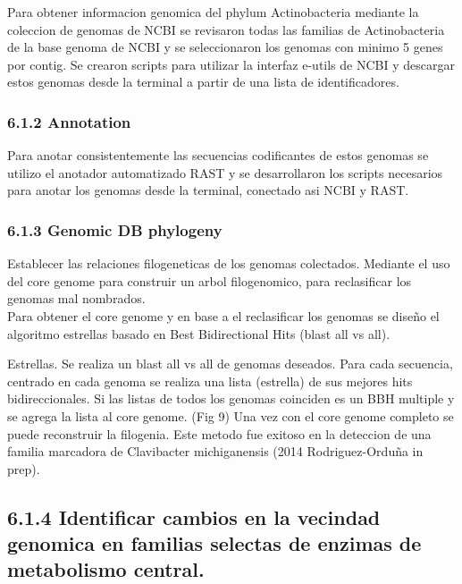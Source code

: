 \documentclass[12pt,twoside]{reedthesis}
\begin{document}
  Para obtener informacion genomica del phylum Actinobacteria mediante la
  coleccion de genomas de NCBI se revisaron todas las familias de
  Actinobacteria de la base genoma de NCBI y se seleccionaron los genomas
  con minimo 5 genes por contig. Se crearon scripts para utilizar la
  interfaz e-utils de NCBI y descargar estos genomas desde la terminal a
  partir de una lista de identificadores.
  
  \subsubsection{6.1.2 Annotation}\label{annotation}
  
  Para anotar consistentemente las secuencias codificantes de estos
  genomas se utilizo el anotador automatizado RAST y se desarrollaron los
  scripts necesarios para anotar los genomas desde la terminal, conectado
  asi NCBI y RAST.
  
  \subsubsection{6.1.3 Genomic DB phylogeny}\label{genomic-db-phylogeny}
  
  Establecer las relaciones filogeneticas de los genomas colectados.
  Mediante el uso del core genome para construir un arbol filogenomico,
  para reclasificar los genomas mal nombrados.\\
  Para obtener el core genome y en base a el reclasificar los genomas se
  diseño el algoritmo estrellas basado en Best Bidirectional Hits (blast
  all vs all).
  
  Estrellas. Se realiza un blast all vs all de genomas deseados. Para cada
  secuencia, centrado en cada genoma se realiza una lista (estrella) de
  sus mejores hits bidireccionales. Si las listas de todos los genomas
  coinciden es un BBH multiple y se agrega la lista al core genome. (Fig
  9) Una vez con el core genome completo se puede reconstruir la
  filogenia. Este metodo fue exitoso en la deteccion de una familia
  marcadora de Clavibacter michiganensis (2014 Rodriguez-Orduña in prep).
  
  \subsection{6.1.4 Identificar cambios en la vecindad genomica en
  familias selectas de enzimas de metabolismo
  central.}\label{identificar-cambios-en-la-vecindad-genomica-en-familias-selectas-de-enzimas-de-metabolismo-central.}
  
\end{document}
